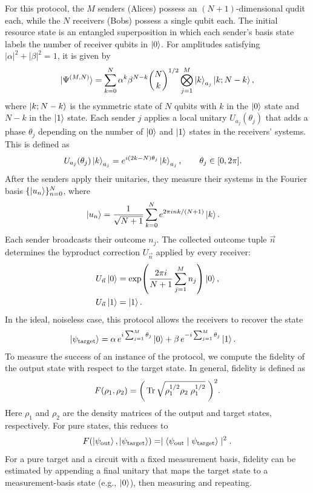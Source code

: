 \documentclass[aps,physrev,10pt,twocolumn,superscriptaddress,floatfix]{revtex4-2}
\DeclareMathOperator{\Tr}{Tr}
\begin{document}
For this protocol, the $M$ senders (Alices) possess an $(N+1)$-dimensional qudit each, while the $N$ receivers (Bobs) possess a single qubit each. The initial resource state is an entangled superposition in which each sender's basis state labels the number of receiver qubits in $\ket{0}$. For amplitudes satisfying $|\alpha|^2+|\beta|^2=1$, it is given by
\begin{align}
\ket{\Psi^{(M,N)}} = \sum_{k=0}^{N}\alpha^k\beta^{N-k}\binom{N}{k}^{1/2}\bigotimes_{j=1}^{M}\ket{k}_{a_j}\ket{k;N-k},\label{eq:resource}
\end{align}
where $\ket{k;N-k}$ is the symmetric state of $N$ qubits with $k$ in the $\ket{0}$ state and $N-k$ in the $\ket{1}$ state.
Each sender $j$ applies a local unitary $U_{a_j}(\theta_j)$ that adds a phase $\theta_j$ depending on the number of $\ket{0}$ and $\ket{1}$ states in the receivers' systems. This is defined as
\begin{align}
U_{a_j}(\theta_j)\ket{k}_{a_j}
&= e^{i(2k-N)\theta_j}\ket{k}_{a_j},
\qquad \theta_j\in[0, 2\pi].\label{eq:sender_phase}
\end{align}
After the senders apply their unitaries, they measure their systems in the Fourier basis $\{\ket{u_n}\}_{n=0}^N$, where
\begin{align}
\ket{u_n}
&= \frac{1}{\sqrt{N+1}}\sum_{k=0}^{N} e^{2\pi i nk/(N+1)}\ket{k}.
\end{align}
Each sender broadcasts their outcome $n_j$. The collected outcome tuple $\vec{n}$ determines the byproduct correction $U_{\vec{n}}$ applied by every receiver:
\begin{align}
U_{\vec{n}}\ket{0}
&= \exp\!\left(\frac{2\pi i}{N+1}\sum_{j=1}^{M}n_j\right)\ket{0}, \\
U_{\vec{n}}\ket{1}
&= \ket{1}.
\end{align}
In the ideal, noiseless case, this protocol allows the receivers to recover the state
\begin{align}
\ket{\psi_{\mathrm{target}}}
&= \alpha\,e^{i\sum_{j=1}^{M}\theta_j}\ket{0} + \beta\,e^{-i\sum_{j=1}^{M}\theta_j}\ket{1}.
\end{align}
%
To measure the success of an instance of the protocol, we compute the fidelity of the output state with respect to the target state. In general, fidelity is defined as
\begin{align}
    F(\rho_1, \rho_2) = \bigg(\Tr\sqrt{\rho_1^{1/2}\rho_2 \hspace{1mm} \rho_1^{1/2}} \hspace{1mm} \bigg)^2.
\end{align}
Here $\rho_1$ and $\rho_2$ are the density matrices of the output and target states, respectively. For pure states, this reduces to
\begin{align}
    F(\ket{\psi_{\mathrm{out}}}, \ket{\psi_{\mathrm{target}}}) = \mid
    \braket{\psi_{\mathrm{out}} \mid \psi_{\mathrm{target}}}\mid^2.
\end{align}
For a pure target and a circuit with a fixed measurement basis, fidelity can be estimated by appending a final unitary that maps the target state to a measurement-basis state (e.g., $\ket{0}$), then measuring and repeating.
\end{document}
